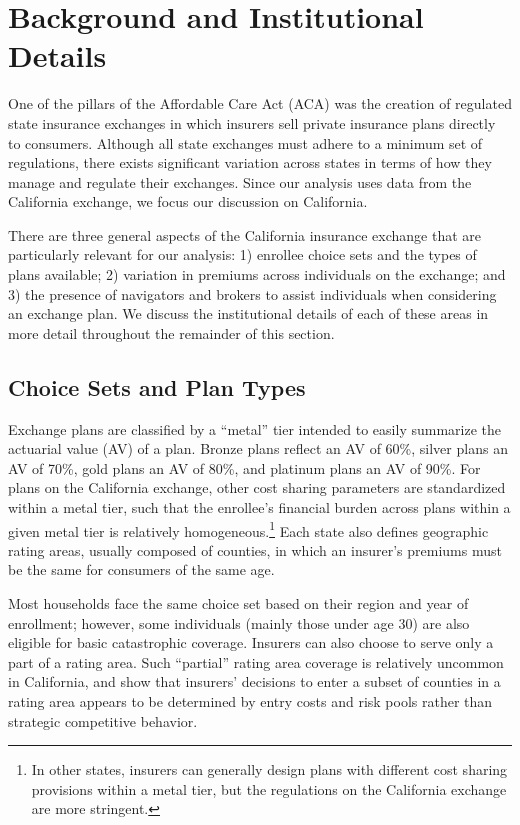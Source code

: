 \documentclass[12pt]{article}
\begin{document}
\section{Background and Institutional Details}
\label{sec:background}

One of the pillars of the Affordable Care Act (ACA) was the creation of regulated state insurance exchanges in which insurers sell private insurance plans directly to consumers. Although all state exchanges must adhere to a minimum set of regulations, there exists significant variation across states in terms of how they manage and regulate their exchanges. Since our analysis uses data from the California exchange, we focus our discussion on California.

There are three general aspects of the California insurance exchange that are particularly relevant for our analysis: 1) enrollee choice sets and the types of plans available; 2) variation in premiums across individuals on the exchange; and 3) the presence of navigators and brokers to assist individuals when considering an exchange plan. We discuss the institutional details of each of these areas in more detail throughout the remainder of this section.

\subsection{Choice Sets and Plan Types}
Exchange plans are classified by a ``metal'' tier intended to easily summarize the actuarial value (AV) of a plan. Bronze plans reflect an AV of 60\%, silver plans an AV of 70\%, gold plans an AV of 80\%, and platinum plans an AV of 90\%. For plans on the California exchange, other cost sharing parameters are standardized within a metal tier, such that the enrollee's financial burden across plans within a given metal tier is relatively homogeneous.\footnote{In other states, insurers can generally design plans with different cost sharing provisions within a metal tier, but the regulations on the California exchange are more stringent.} Each state also defines geographic rating areas, usually composed of counties, in which an insurer's premiums must be the same for consumers of the same age.

Most households face the same choice set based on their region and year of enrollment; however, some individuals (mainly those under age 30) are also eligible for basic catastrophic coverage. Insurers can also choose to serve only a part of a rating area. Such ``partial'' rating area coverage is relatively uncommon in California, and \cite{fang2020} show that insurers' decisions to enter a subset of counties in a rating area appears to be determined by entry costs and risk pools rather than strategic competitive behavior.
\end{document}
